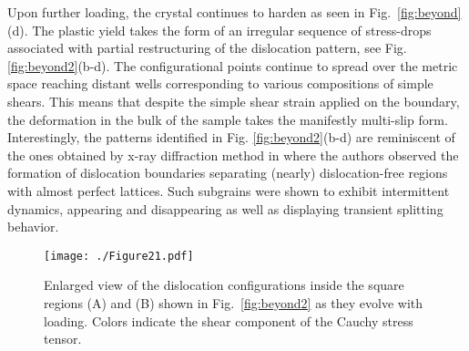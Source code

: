 \documentclass[CRPHYS,Unicode,manuscript]{cedram}
\begin{document}

Upon further loading, the crystal continues to  harden as seen in Fig.~\ref{fig:beyond}(d). The  plastic yield takes the form  of  an irregular sequence of stress-drops associated with partial restructuring of the dislocation pattern, see Fig. \ref{fig:beyond2}(b-d).  The configurational points continue to spread over the metric space reaching  distant wells corresponding to various compositions of simple shears. This means that despite the simple shear strain applied on the boundary, the deformation in the bulk of the sample takes the manifestly multi-slip form.   Interestingly, the   patterns identified  in Fig. \ref{fig:beyond2}(b-d) are reminiscent of the ones obtained by  x-ray diffraction method  in \cite{Jakobsen2006-ai} where the authors observed the formation of   dislocation boundaries separating (nearly) dislocation-free regions with almost perfect lattices. Such  subgrains were shown to exhibit  intermittent dynamics,   appearing and disappearing  as well as displaying transient splitting behavior.  

  
 




 
 \begin{figure}[h!]
\centering
\texttt{[image: ./Figure21.pdf]}
\caption{\scriptsize {Enlarged view of the dislocation configurations inside the square regions  (A) and (B) shown in Fig.~\ref{fig:beyond2} as they evolve with  loading. Colors indicate the shear component of the Cauchy stress tensor.
}
\label{fig:zooms}}
\end{figure}

\end{document}
